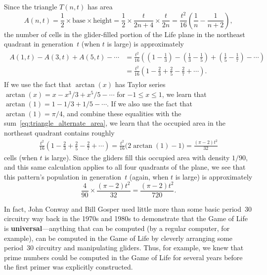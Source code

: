 \begin{itemize}
	Since the triangle $T(n,t)$ has area
	\[
		A(n,t) = \frac{1}{2} \times \text{base} \times \text{height} = \frac{1}{2} \times \frac{t}{2n + 4} \times \frac{t}{2n} = \frac{t^2}{16} \left(\frac{1}{n} - \frac{1}{n+2}\right),
	\]
	the number of cells in the glider-filled portion of the Life plane in the northeast quadrant in generation~$t$ (when $t$ is large) is approximately
	\begin{align}\begin{split}\label{eq:triangle_alternate_area}
		A(1,t) - A(3,t) + A(5,t) - \cdots & = \frac{t^2}{16} \left( \left(1 - \frac{1}{3}\right) - \left(\frac{1}{3} - \frac{1}{5}\right) + \left(\frac{1}{5} - \frac{1}{7}\right) - \cdots\right) \\
		& = \frac{t^2}{16} \left( 1 - \frac{2}{3} + \frac{2}{5} - \frac{2}{7} + \cdots\right).
	\end{split}\end{align}
	If we use the fact that $\arctan(x)$ has Taylor series $\arctan(x) = x - x^3/3 + x^5/5 - \cdots$ for $-1 \leq x \leq 1$, we learn that $\arctan(1) = 1 - 1/3 + 1/5 - \cdots$. If we also use the fact that $\arctan(1) = \pi/4$, and combine these equalities with the sum~\eqref{eq:triangle_alternate_area}, we learn that the occupied area in the northeast quadrant contains roughly
	\begin{align*}
		\frac{t^2}{16} \left( 1 - \frac{2}{3} + \frac{2}{5} - \frac{2}{7} + \cdots\right) = \frac{t^2}{16}\big( 2\arctan(1) - 1\big) = \frac{(\pi-2)t^2}{32}
	\end{align*}
	cells (when $t$ is large). Since the gliders fill this occupied area with density $1/90$, and this same calculation applies to all four quadrants of the plane, we see that this pattern's population in generation~$t$ (again, when $t$ is large) is approximately
	\[
		\frac{4}{90} \times \frac{(\pi-2)t^2}{32} = \frac{(\pi-2)t^2}{720}.
	\]
\end{itemize}

In fact, John Conway and Bill Gosper used little more than some basic period~$30$ circuitry way back in the 1970s and 1980s \cite[Chapter~25]{BCG82} to demonstrate that the Game of Life is \textbf{universal}---anything that can be computed (by a regular computer, for example), can be computed in the Game of Life by cleverly arranging some period~$30$ circuitry and manipulating gliders. Thus, for example, we knew that prime numbers could be computed in the Game of Life for several years before the first primer was explicitly constructed.

